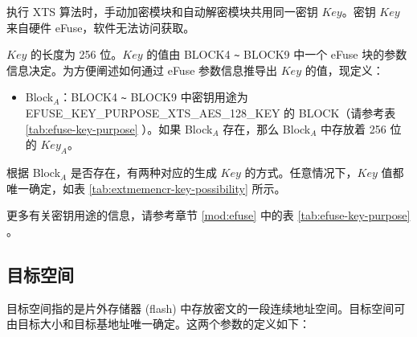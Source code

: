 \documentclass[main\_\_CN.tex]{subfiles}
\begin{document}
执行 XTS 算法时，手动加密模块和自动解密模块共用同一密钥 \begin{math}\mathit{Key}\end{math}。密钥 \begin{math}\mathit{Key}\end{math} 来自硬件 eFuse，软件无法访问获取。

\begin{math}\mathit{Key}\end{math} 的长度为 256 位。\begin{math}\mathit{Key}\end{math} 的值由 BLOCK4 \verb+~+ BLOCK9 中一个 eFuse 块的参数信息决定。为方便阐述如何通过 eFuse 参数信息推导出 \begin{math}\mathit{Key}\end{math} 的值，现定义：
\begin{itemize}
    \item Block$_A$：BLOCK4 \verb+~+ BLOCK9 中密钥用途为 EFUSE\_KEY\_PURPOSE\_XTS\_AES\_128\_KEY 的 BLOCK（请参考表 \ref{tab:efuse-key-purpose} \textit{}）。如果 Block$_A$ 存在，那么 Block$_A$ 中存放着 256 位的 \begin{math}\mathit{Key}_{A}\end{math}。
\end{itemize}

根据 Block$_A$ 是否存在，有两种对应的生成 \begin{math}\mathit{Key}\end{math} 的方式。任意情况下，\begin{math}\mathit{Key}\end{math} 值都唯一确定，如表 \ref{tab:extmemencr-key-possibility} 所示。



更多有关密钥用途的信息，请参考章节 \ref{mod:efuse} \textit{} 中的表 \ref{tab:efuse-key-purpose} \textit{}。

\subsection{目标空间}
\label{sec:extmemencr-target-space}

目标空间指的是片外存储器 (flash) 中存放密文的一段连续地址空间。目标空间可由目标大小和目标基地址唯一确定。这两个参数的定义如下：
\end{document}
